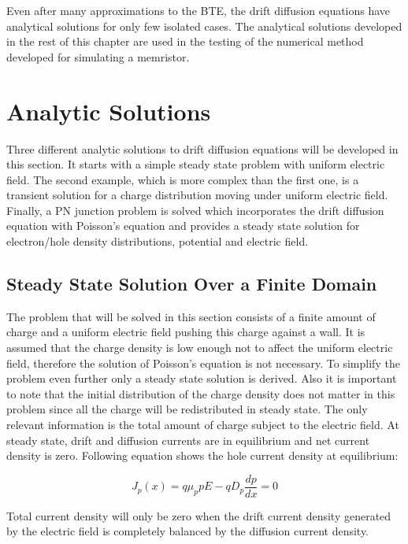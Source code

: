 \begin{doublespace}
Even after many approximations to the BTE, the drift diffusion equations have analytical solutions for only few isolated cases. The analytical solutions developed in the rest of this chapter are used in the testing of the numerical method developed for simulating a memristor. 

\clearpage
\section{Analytic Solutions}

Three different analytic solutions to drift diffusion equations will be developed in this section. It starts with a simple steady state problem with uniform electric field. The second example, which is more complex than the first one, is a transient solution for a charge distribution moving under uniform electric field. Finally, a PN junction problem is solved which incorporates the drift diffusion equation with Poisson's equation and provides a steady state solution for electron/hole density distributions, potential and electric field. 
  
\subsection{Steady State Solution Over a Finite Domain}

The problem that will be solved in this section consists of a finite amount of charge and a uniform electric field pushing this charge against a wall. It is assumed that the charge density is low enough not to affect the uniform electric field, therefore the solution of Poisson's equation is not necessary. To simplify the problem even further only a steady state solution is derived. Also it is important to note that the initial distribution of the charge density does not matter in this problem since all the charge will be redistributed in steady state. The only relevant information is the total amount of charge subject to the electric field. At steady state, drift and diffusion currents are in equilibrium and net current density is zero. Following equation shows the hole current density at equilibrium:

\begin{equation}
J_p(x)=q \mu_{p} p E-qD_{p} \frac{dp}{dx} =0
\end{equation}

Total current density will only be zero when the drift current density generated by the electric field is completely balanced by the diffusion current density.


\end{doublespace}
